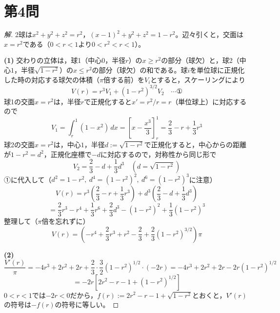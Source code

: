 \documentclass[../main.tex]{subfiles}
\begin{document}
\newpage

\section*{第4問}

\begin{proof}[解]
  2球は$x^2+y^2+z^2=r^2$，$(x-1)^2+y^2+z^2=1-r^2$。辺々引くと，交面は$x=r^2$である（$0<r<1$より$0<r^2<r<1$）。

  \textbf{(1)} 交わりの立体は，球1（中心$0$，半径$r$）の$x\ge r^2$の部分（球欠）と，球2（中心$1$，半径$\sqrt{1-r^2}$）の$x\le r^2$の部分（球欠）の和である。球$i$を単位球に正規化した時の対応する球欠の体積（$\pi$倍する前）を$V_i$とすると，スケーリングにより
  \[
    V(r)=r^3V_1+(1-r^2)^{3/2}V_2 \quad\cdots\text{①}
  \]
  球1の交面$x=r^2$は，半径$r$で正規化すると$x'=r^2/r=r$（単位球上）に対応するので
  \[
    V_1=\int_r^1(1-x^2)\,dx=\left[x-\frac{x^3}3\right]_r^1=\frac23-r+\frac13r^3
  \]
  球2の交面$x=r^2$は，中心$1$，半径$d:=\sqrt{1-r^2}$で正規化すると，中心からの距離が$1-r^2=d^2$，正規化座標で$-d$に対応するので，対称性から同じ形で
  \[
    V_2=\frac23-d+\frac13d^3 \quad(d=\sqrt{1-r^2})
  \]
  ①に代入して（$d^2=1-r^2,\ d^4=(1-r^2)^2,\ d^6=(1-r^2)^3$に注意）
  \[
    V(r)=r^3\left(\frac23-r+\frac13r^3\right)+d^3\left(\frac23-d+\frac13d^3\right)
  \]
  \[
    =\frac23r^3-r^4+\frac13r^6+\frac23d^3-(1-r^2)^2+\frac13(1-r^2)^3
  \]
  整理して（$\pi$倍を忘れずに）
  \[
    V(r)=\left(-r^4+\frac23r^3+r^2-\frac23+\frac23(1-r^2)^{3/2}\right)\pi
  \]

  \textbf{(2)}
  \[
    \frac{V'(r)}\pi=-4r^3+2r^2+2r+\frac23\cdot\frac32(1-r^2)^{1/2}\cdot(-2r)=-4r^3+2r^2+2r-2r(1-r^2)^{1/2}
  \]
  \[
    =-2r\left[2r^2-r-1+(1-r^2)^{1/2}\right]
  \]
  $0<r<1$では$-2r<0$だから，$f(r):=2r^2-r-1+\sqrt{1-r^2}$とおくと，$V'(r)$の符号は$-f(r)$の符号に等しい。


\end{proof}
\end{document}
